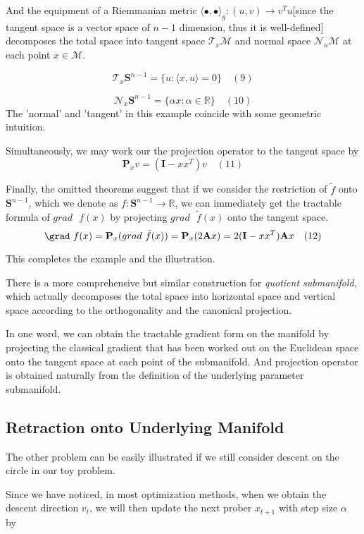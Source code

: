 \documentclass[letterpaper]{article}
\begin{document}
And the equipment of a Riemmanian metric $\langle\bullet,\bullet\rangle_g:(\mathit{u},\mathit{v})\to{v^{T}u}$[since the tangent space is a vector space of $n-1$ dimension, thus it is well-defined] decomposes the
total space into tangent space $\mathcal{T}_x\mathcal{M}$ and normal space $\mathcal{N}_u\mathcal{M}$ at each point $x\in\mathcal{M}$.

$$
    \mathcal{T}_x{\mathbf{S}^{n-1}}=\{u: \langle{}x,u\rangle=0 \} \quad (9)
$$

$$
   \mathcal{N}_x{\mathbf{S}^{n-1}}=\{\alpha{x}: \alpha\in\mathbb{R}\} \quad (10)
$$
The 'normal' and 'tangent' in this example coincide with some geometric intuition.

Simultaneously, we may work our the projection operator to the tangent space by
$$
    \mathbf{P}_x\mathit{v}=(\mathbf{I}-xx^{T})\mathit{v} \quad (11)
$$


Finally, the omitted theorems suggest that if we consider the restriction of $\tilde{f}$ onto $\mathbf{S}^{n-1}$, which we denote as $f:\mathbf{S}^{n-1}\to\mathbb{R}$,
we can immediately get the tractable formula of $grad\text{ }f(x)$ by projecting $grad\text{ }\tilde{f}(x)$ onto the tangent space.
$$
    \grad\text{ }f(x)=\mathbf{P}_x(grad\text{ }\tilde{f}(x))=\mathbf{P}_x(2\mathbf{A}x)=2(\mathbf{I}-xx^{T})\mathbf{A}x \quad (12)
$$

This completes the example and the illustration.

There is a more comprehensive but similar construction for \textit{quotient submanifold}, which actually decomposes the total space into horizontal space and vertical space according to
the orthogonality and the canonical projection.

In one word, we can obtain the tractable gradient form on the manifold by projecting the classical gradient that has been worked out on the Euclidean space onto the tangent space at each point of the submanifold. And
projection operator is obtained naturally from the definition of the underlying parameter submanifold.

\subsection{Retraction onto Underlying Manifold}
The other problem can be easily illustrated if we still consider descent on the circle in our toy problem.

Since we have noticed, in most optimization methods, when we obtain the descent direction $\mathit{v}_t$,
we will then update the next prober $x_{t+1}$ with step size $\alpha$ by
\end{document}
